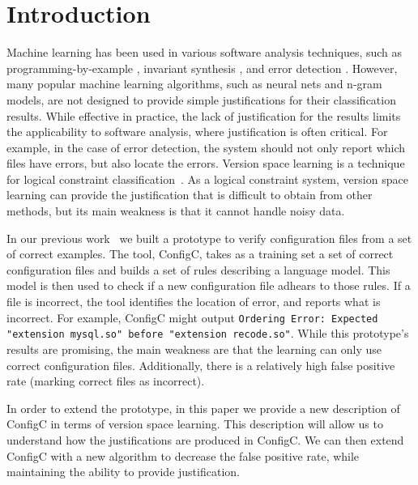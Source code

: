 \section{Introduction}

Machine learning has been used in various software analysis techniques, such as programming-by-example \cite{lau2000version}, invariant synthesis \cite{garg2014ice}, and error detection \cite{Santolucito2016}.
However, many popular machine learning algorithms, such as neural nets and n-gram models, are not designed to provide simple justifications for their classification results.
While effective in practice, the lack of justification for the results limits the applicability to software analysis, where justification is often critical.
For example, in the case of error detection, the system should not only report which files have errors, but also locate the errors.
Version space learning is a technique for logical constraint classification~\cite{mitchell82}.
As a logical constraint system, version space learning can provide the justification that is difficult to obtain from other methods, but its main weakness is that it cannot handle noisy data.


In our previous work~\cite{Santolucito2016} we built a prototype to verify configuration files from a set of correct examples.
The tool, ConfigC, takes as a training set a set of correct configuration files and builds a set of rules describing a language model.
This model is then used to check if a new configuration file adhears to those rules.
If a file is incorrect, the tool identifies the location of error, and reports what is incorrect.
For example, ConfigC might output \texttt{Ordering Error: Expected "extension mysql.so" before "extension recode.so"}.
While this prototype's results are promising, the main weakness are that the learning can only use correct configuration files.
Additionally, there is a relatively high false positive rate (marking correct files as incorrect).

In order to extend the prototype, in this paper we provide a new description of ConfigC in terms of version space learning.
This description will allow us to understand how the justifications are produced in ConfigC.
We can then extend ConfigC with a new algorithm to decrease the false positive rate, while maintaining the ability to provide justification.

